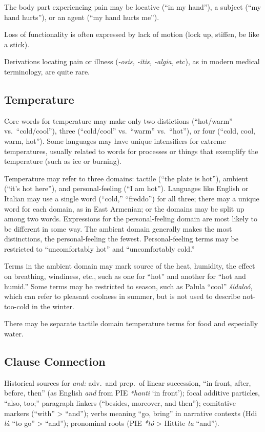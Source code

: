 \documentclass[11pt]{article}
\begin{document}
The body part experiencing pain may be locative (``in my hand''), a
subject (``my hand hurts''), or an agent (``my hand hurts me'').

Loss of functionality is often expressed by lack of motion (lock up,
stiffen, be like a stick).

Derivations locating pain or illness (\textit{-osis, -itis, -algia,}
etc), as in modern medical terminology, are quite rare.

\subsection{Temperature}
Core words for temperature may make only two distictions (``hot/warm''
vs.\ ``cold/cool''), three (``cold/cool'' vs.\ ``warm'' vs.\ ``hot''),
or four (``cold, cool, warm, hot''). Some languages may have unique
intensifiers for extreme temperatures, usually related to words for
processes or things that exemplify the temperature (such as ice or
burning).

Temperature may refer to three domains: tactile (``the plate is
hot''), ambient (``it's hot here''), and personal-feeling (``I am
hot'').  Languages like English or Italian may use a single word
(``cold,'' ``freddo'') for all three; there may a unique word for each
domain, as in East Armenian; or the domains may be split up among two
words.  Expressions for the personal-feeling domain are most likely to
be different in some way.  The ambient domain generally makes the most
distinctions, the personal-feeling the fewest.  Personal-feeling terms
may be restricted to ``uncomfortably hot'' and ``uncomfortably cold.''

Terms in the ambient domain may mark source of the heat, humidity, the
effect on breathing, windiness, etc., such as one for ``hot'' and
another for ``hot and humid.''  Some terms may be restricted to
season, such as Palula ``cool'' \textit{šidaloó}, which can refer to
pleasant coolness in summer, but is not used to describe not-too-cold
in the winter.

There may be separate tactile domain temperature terms for food and
especially water.

\subsection{Clause Connection}
Historical sources for \textit{and:} adv.\ and prep.\ of linear
succession, ``in front, after, before, then'' (as English \textit{and}
from PIE \textit{*hanti} `in front'); focal additive particles, ``also,
too;'' paragraph linkers (``besides, moreover, and then''); comitative
markers (``with'' > ``and''); verbs meaning ``go, bring'' in narrative
contexts (Hdi \textit{là} ``to go'' > ``and''); pronominal roots (PIE
\textit{*tó} > Hittite \textit{ta} ``and'').
\end{document}
